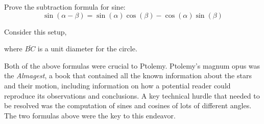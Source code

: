\documentclass[newpage,hints,handout]{ximera}
\begin{document}
\begin{problem}
Prove the subtraction formula for sine:
\[
\sin(\alpha - \beta) = \sin(\alpha)\cos(\beta) -
\cos(\alpha)\sin(\beta)
\]
\begin{hint}
Consider this setup, 
\begin{image}
\end{image}
where $\bar{BC}$ is a unit diameter for the circle.
\end{hint}
\end{problem}

Both of the above formulas were crucial to Ptolemy.  Ptolemy's magnum opus was
the \textit{Almagest}, a book that contained all the known information about the
stars and their motion, including information on how a potential
reader could reproduce its observations and conclusions. A key
technical hurdle that needed to be resolved was the computation of
sines and cosines of lots of different angles. The two formulas above were the
key to this endeavor.




\end{document}
